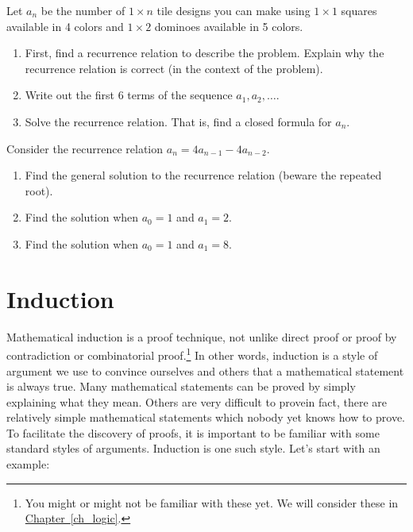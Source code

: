 \documentclass[11pt,]{book}
\theoremstyle{ptxplainnotitle}
\theoremstyle{ptxplaintitle}
\theoremstyle{ptxdefinitionnotitle}
\theoremstyle{ptxdefinitiontitle}
\theoremstyle{ptxdefinitionnotitle}
\theoremstyle{ptxdefinitiontitle}
\theoremstyle{ptxdefinitionnotitle}
\theoremstyle{ptxdefinitiontitle}
\theoremstyle{ptxdefinitiontitlenonumber}
\theoremstyle{ptxdefinitiontitlenonumber}
\numberwithin{equation}{chapter}
\begin{document}
\begin{divisionexercise}{11}\hypertarget{exercise-52}{}
\hypertarget{p-530}{}%
Let \(a_n\) be the number of \(1 \times n\) tile designs you can make using \(1 \times 1\) squares available in 4 colors and \(1 \times 2\) dominoes available in 5 colors.%
\leavevmode%
\begin{enumerate}[label=(\alph*)]
\item\hypertarget{li-241}{}\hypertarget{p-531}{}%
First, find a recurrence relation to describe the problem. Explain why the recurrence relation is correct (in the context of the problem). %
\item\hypertarget{li-242}{}\hypertarget{p-532}{}%
Write out the first 6 terms of the sequence \(a_1, a_2, \ldots\). %
\item\hypertarget{li-243}{}\hypertarget{p-533}{}%
Solve the recurrence relation. That is, find a closed formula for \(a_n\). %
\end{enumerate}
\end{divisionexercise}%
\begin{divisionexercise}{12}\hypertarget{exercise-53}{}
\hypertarget{p-534}{}%
Consider the recurrence relation \(a_n = 4a_{n-1} - 4a_{n-2}\).%
\leavevmode%
\begin{enumerate}[label=(\alph*)]
\item\hypertarget{li-244}{}\hypertarget{p-535}{}%
Find the general solution to the recurrence relation (beware the repeated root). %
\item\hypertarget{li-245}{}\hypertarget{p-536}{}%
Find the solution when \(a_0 = 1\) and \(a_1 = 2\). %
\item\hypertarget{li-246}{}\hypertarget{p-537}{}%
Find the solution when \(a_0 = 1\) and \(a_1 = 8\). %
\end{enumerate}
\end{divisionexercise}%
\typeout{************************************************}
\typeout{************************************************}
\section[{Induction}]{Induction}\label{sec_seq-induction}
\hypertarget{p-538}{}%
 Mathematical induction is a proof technique, not unlike direct proof or proof by contradiction or combinatorial proof.\footnote{You might or might not be familiar with these yet.  We will consider these in \hyperref[ch_logic]{Chapter~\ref{ch_logic}}.\label{fn-3}} In other words, induction is a style of argument we use to convince ourselves and others that a mathematical statement is always true. Many mathematical statements can be proved by simply explaining what they mean. Others are very difficult to prove\textemdash{}in fact, there are relatively simple mathematical statements which nobody yet knows how to prove. To facilitate the discovery of proofs, it is important to be familiar with some standard styles of arguments. Induction is one such style. Let's start with an example:%
\typeout{************************************************}
\typeout{************************************************}
\end{document}

